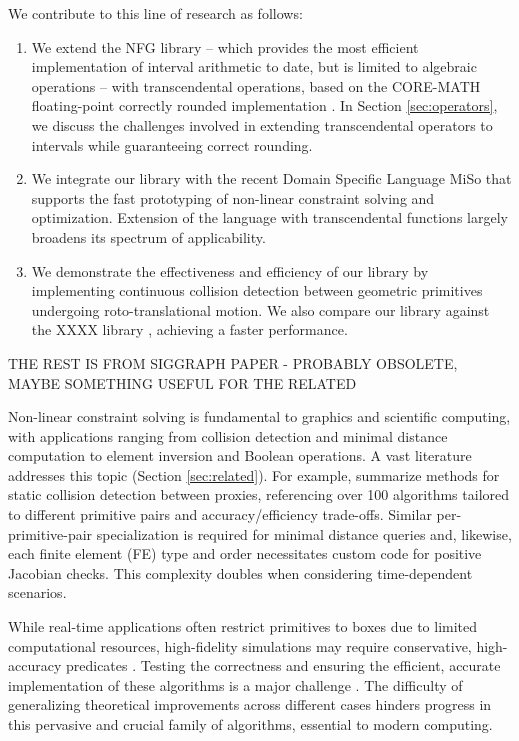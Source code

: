 We contribute to this line of research as follows:
\begin{enumerate}
\item We extend the NFG library \cite{libreria-Marco} -- which provides the most efficient implementation of interval arithmetic to date, but is limited to algebraic operations -- with transcendental operations, based on the CORE-MATH floating-point correctly rounded implementation \cite{core-math}.
In Section \ref{sec:operators}, we discuss the challenges involved in extending transcendental operators to intervals while guaranteeing correct rounding. 
\item We integrate our library with the recent Domain Specific Language MiSo \cite{MiSo} that supports the fast prototyping of non-linear constraint solving and optimization. 
Extension of the language with transcendental functions largely broadens its spectrum of applicability. 
\item We demonstrate the effectiveness and efficiency of our library by implementing continuous collision detection between geometric primitives undergoing roto-translational motion.  We also compare our library against the XXXX library \cite{something}, achieving a faster performance.
\end{enumerate}



THE REST IS FROM SIGGRAPH PAPER - PROBABLY OBSOLETE, MAYBE SOMETHING USEFUL FOR THE RELATED

Non-linear constraint solving is fundamental to graphics and scientific computing, with applications ranging from collision detection and minimal distance computation to element inversion and Boolean operations. A vast literature addresses this topic (Section \ref{sec:related}). For example, \cite{RTR4,Akenine2024} summarize methods for static collision detection between proxies, referencing over 100 algorithms tailored to different primitive pairs and accuracy/efficiency trade-offs.
Similar per-primitive-pair specialization is required for minimal distance queries and, likewise, each finite element (FE) type and order necessitates custom code for positive Jacobian checks.
This complexity doubles when considering time-dependent scenarios.

While real-time applications often restrict primitives to boxes due to limited computational resources, high-fidelity simulations may require conservative, high-accuracy predicates \cite{snyder92}.
Testing the correctness and ensuring the efficient, accurate implementation of these algorithms is a major challenge \cite{Wang2021}. The difficulty of generalizing theoretical improvements across different cases hinders progress in this pervasive and crucial family of algorithms, essential to modern computing.

